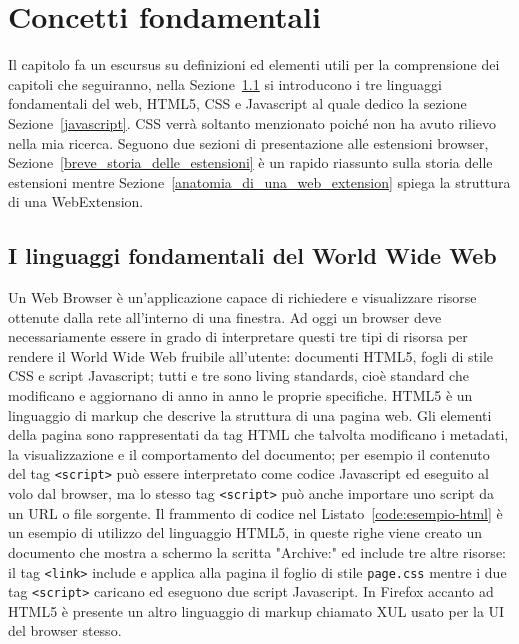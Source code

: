 \documentclass{sapthesis}
\newcommand{\code}[1]{\texttt{#1}}
\newcommand{\Sezione}[1]{Sezione~\ref{#1}}
\newcommand{\www}{World Wide Web }
\begin{document}
\chapter{Concetti fondamentali}
    Il capitolo fa un escursus su definizioni ed elementi utili per la comprensione dei capitoli che seguiranno,
    nella \Sezione{I-linguaggi-fondamentali-del-www} si introducono i tre linguaggi fondamentali del web, HTML5,
    CSS e Javascript al quale dedico la sezione \Sezione{javascript}. CSS verrà soltanto menzionato poiché non ha
    avuto rilievo nella mia ricerca. Seguono due sezioni di presentazione alle estensioni browser, \Sezione{breve_storia_delle_estensioni}
      è un rapido riassunto sulla storia delle estensioni 
    mentre \Sezione{anatomia_di_una_web_extension} spiega la struttura di una WebExtension.


    \section{I linguaggi fondamentali del \www}
    \label{I-linguaggi-fondamentali-del-www}
        Un Web Browser è un'applicazione capace di richiedere e visualizzare risorse ottenute dalla rete
        all'interno di una finestra.
        Ad oggi un browser deve necessariamente essere in grado di interpretare questi tre tipi di risorsa 
        per rendere il \www fruibile all'utente: documenti HTML5, fogli di stile CSS e script Javascript;
        tutti e tre sono living standards, cioè standard che modificano e aggiornano di anno in anno le
        proprie specifiche.
        HTML5 è un linguaggio di markup che descrive la struttura di una pagina web. Gli elementi della 
        pagina sono rappresentati da tag HTML che talvolta modificano i metadati, la visualizzazione e 
        il comportamento del documento; per esempio il contenuto del tag \code{<script>} può essere interpretato 
        come codice Javascript ed eseguito al volo dal browser, ma lo stesso tag \code{<script>} può anche importare
        uno script da un URL o file sorgente.
        Il frammento di codice nel Listato~\ref{code:esempio-html} è un esempio di utilizzo del linguaggio HTML5, in queste
        righe viene creato un documento che mostra a schermo la scritta "Archive:" ed include tre altre risorse:
        il tag \code{<link>} include e applica alla pagina il foglio di stile \code{page.css} mentre i due tag
        \code{<script>} caricano ed eseguono due script Javascript.
        In Firefox accanto ad HTML5 è presente un altro linguaggio di markup 
        chiamato XUL usato per la UI del browser stesso.
\end{document}
